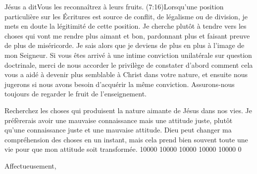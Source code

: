 \begin{pocketpar}{}
Jésus a dit\frcolon \Og Vous les reconnaîtrez à leurs fruits. \Fg{}
 (7:16)Lorsqu'une position particulière
 sur les Écritures est source de conflit, de légalisme ou de division,
 je mets en doute la légitimité de cette position.
 Je cherche plutôt à tendre vers les choses qui vont me rendre plus aimant et bon,
 pardonnant plus et faisant preuve de plus de miséricorde.
 Je sais alors que je deviens de plus en plus à l'image de mon Seigneur.
Si vous êtes arrivé à une intime conviction unilatérale sur question doctrinale,
 merci de nous accorder le privilège de constater d'abord comment cela
 vous a aidé à devenir plus semblable à Christ dans votre nature,
 et ensuite nous jugerons si nous avons besoin d'acquérir la même conviction.
 Assurons-nous toujours de regarder le fruit de l'enseignement.
\end{pocketpar}

\begin{pocketpar}{}
Recherchez les choses qui produisent la nature \digestlinebreak
 aimante de Jésus dans nos vies.
 Je préfèrerais avoir une mauvaise connaissance mais une attitude juste, \pocketlinebreak
 plutôt qu'une connaissance juste et une mauvaise \digestlinebreak
 attitude.
 Dieu peut changer ma compréhension des choses en un instant,
 mais cela prend bien \digestlinebreak
 souvent toute une vie pour que mon attitude \digestlinebreak\pocketlinebreak
 soit transformée.
 \begingroup{} 10000 10000 10000 10000 10000 0
 \par\endgroup
\end{pocketpar}


\nobreak
\vspace{5mm}
Affectueusement,

\nobreak
\signature{Chuck Smith}

\closechapter

